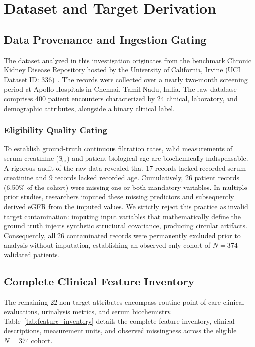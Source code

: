 \documentclass[conference]{IEEEtran}
\begin{document}
\section{Dataset and Target Derivation}

\subsection{Data Provenance and Ingestion Gating}
The dataset analyzed in this investigation originates from the benchmark Chronic Kidney Disease Repository hosted by the University of California, Irvine (UCI Dataset ID: 336)~\cite{misc_chronic_kidney_disease_336}. The records were collected over a nearly two-month screening period at Apollo Hospitals in Chennai, Tamil Nadu, India. The raw database comprises 400 patient encounters characterized by 24 clinical, laboratory, and demographic attributes, alongside a binary clinical label.

\subsubsection{Eligibility Quality Gating}
To establish ground-truth continuous filtration rates, valid measurements of serum creatinine ($\text{S}_{\text{cr}}$) and patient biological age are biochemically indispensable. A rigorous audit of the raw data revealed that 17 records lacked recorded serum creatinine and 9 records lacked recorded age. Cumulatively, 26 patient records (6.50\% of the cohort) were missing one or both mandatory variables. In multiple prior studies, researchers imputed these missing predictors and subsequently derived eGFR from the imputed values. We strictly reject this practice as invalid target contamination: imputing input variables that mathematically define the ground truth injects synthetic structural covariance, producing circular artifacts. Consequently, all 26 contaminated records were permanently excluded prior to analysis without imputation, establishing an observed-only cohort of $N = 374$ validated patients.

\subsection{Complete Clinical Feature Inventory}
The remaining 22 non-target attributes encompass routine point-of-care clinical evaluations, urinalysis metrics, and serum biochemistry. Table~\ref{tab:feature_inventory} details the complete feature inventory, clinical descriptions, measurement units, and observed missingness across the eligible $N = 374$ cohort.
\end{document}
